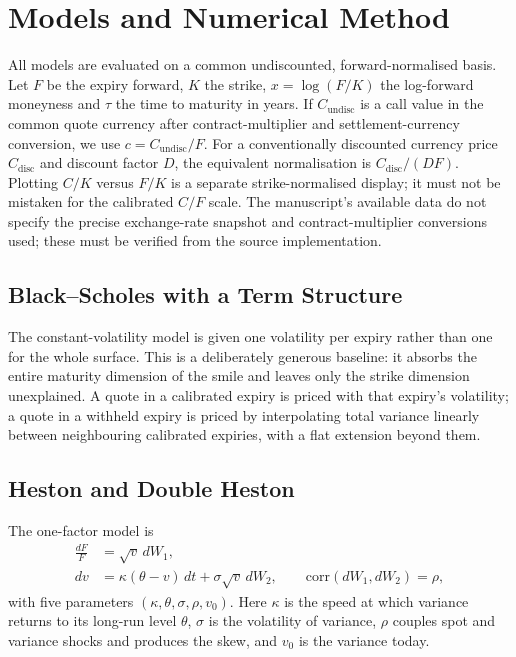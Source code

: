 \documentclass[runningheads]{llncs}
\begin{document}
\section{Models and Numerical Method}
\label{sec:models}

All models are evaluated on a common undiscounted, forward-normalised
basis. Let $F$ be the expiry forward, $K$ the strike, $x = \log(F/K)$
the log-forward moneyness and $\tau$ the time to maturity in years. If
$C_{\mathrm{undisc}}$ is a call value in the common quote currency after
contract-multiplier and settlement-currency conversion, we use
$c = C_{\mathrm{undisc}}/F$. For a conventionally discounted currency
price $C_{\mathrm{disc}}$ and discount factor $D$, the equivalent
normalisation is $C_{\mathrm{disc}}/(DF)$. Plotting $C/K$ versus $F/K$
is a separate strike-normalised display; it must not be mistaken for the
calibrated $C/F$ scale. The manuscript's available data do not specify
the precise exchange-rate snapshot and contract-multiplier conversions
used; these must be verified from the source implementation.

\subsection{Black--Scholes with a Term Structure}
\label{sec:bs}

The constant-volatility model is given one volatility per expiry rather
than one for the whole surface. This is a deliberately generous
baseline: it absorbs the entire maturity dimension of the smile and
leaves only the strike dimension unexplained. A quote in a calibrated
expiry is priced with that expiry's volatility; a quote in a withheld
expiry is priced by interpolating total variance linearly between
neighbouring calibrated expiries, with a flat extension beyond them.

\subsection{Heston and Double Heston}
\label{sec:heston}

The one-factor model is
\begin{align}
\frac{dF}{F} &= \sqrt{v}\, dW_1, \\
dv &= \kappa(\theta - v)\, dt + \sigma \sqrt{v}\, dW_2,
\qquad \mathrm{corr}(dW_1, dW_2) = \rho,
\end{align}
with five parameters $(\kappa, \theta, \sigma, \rho, v_0)$. Here
$\kappa$ is the speed at which variance returns to its long-run level
$\theta$, $\sigma$ is the volatility of variance, $\rho$ couples spot
and variance shocks and produces the skew, and $v_0$ is the variance
today.
\end{document}
